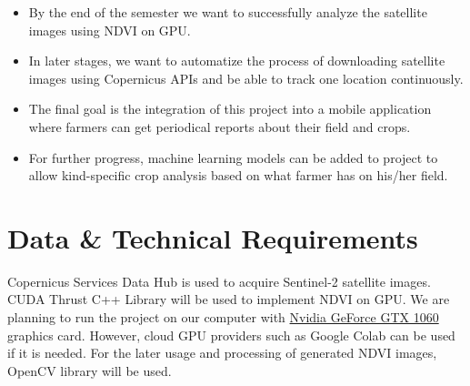 \documentclass{article} %
\begin{document}
\begin{itemize}
\item By the end of the semester we want to successfully analyze the satellite images using NDVI on GPU.
\item In later stages, we want to automatize the process of downloading satellite images using Copernicus APIs and be able to track one location continuously.
\item The final goal is the integration of this project into a mobile application where farmers can get periodical reports about their field and crops.
\item For further progress, machine learning models can be added to project to allow kind-specific crop analysis based on what farmer has on his/her field.
\end{itemize}

\section{Data \& Technical Requirements}

Copernicus Services Data Hub is used to acquire Sentinel-2 satellite images. CUDA Thrust C++ Library will be used to implement NDVI on GPU. We are planning to run the project on our computer with \href{https://www.geforce.com/hardware/desktop-gpus/geforce-gtx-1060/specifications}{Nvidia GeForce GTX 1060} graphics card. However, cloud GPU providers such as Google Colab can be used if it is needed. For the later usage and processing of generated NDVI images, OpenCV library will be used.







%
%
%
\end{document}
